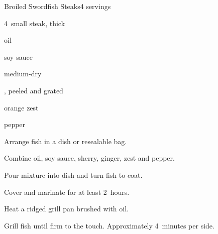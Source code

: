 \begin{recipe}{Broiled Swordfish Steaks}{}{4 servings}

\begin{ingredients}
\item 4~small  steak, \inch{\threequarter} thick
\item \C{\half} oil
\item {} soy sauce
\item {} medium-dry 
\item \tp{1\half} , peeled and grated 
\item {} orange zest
\item pepper
\end{ingredients}

\begin{directions}
\item Arrange fish in a dish or resealable bag.
\item Combine oil, soy sauce, sherry, ginger, zest and pepper.
\item Pour mixture into dish and turn fish to coat.
\item Cover and marinate for at least 2~hours.
\item Heat a ridged grill pan brushed with oil.
\item Grill fish until firm to the touch. Approximately 4~minutes per side.
\end{directions}

\end{recipe}
